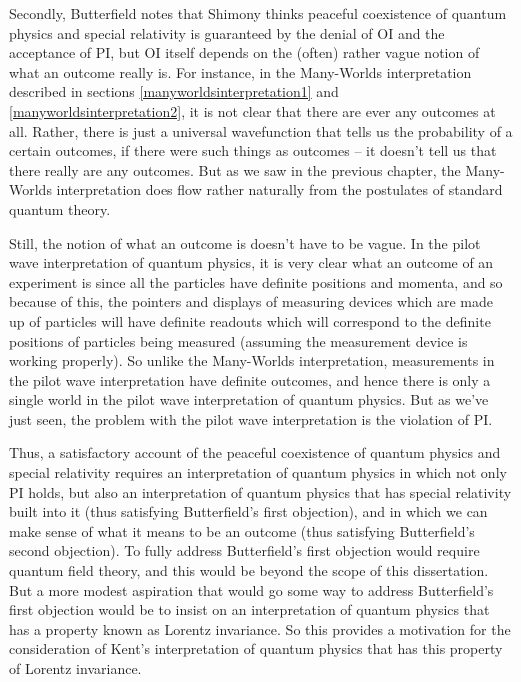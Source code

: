 Secondly,  Butterfield notes that Shimony thinks peaceful coexistence of quantum physics and special relativity is guaranteed by the denial of OI and the acceptance of PI, but OI itself depends on the (often) rather vague notion of what an outcome really is. For instance, in the Many-Worlds interpretation described in sections \ref{manyworldsinterpretation1} and \ref{manyworldsinterpretation2}, it is not clear that there are ever any outcomes at all. Rather, there is just a universal wavefunction that tells us the probability of a certain outcomes, if there were such things as outcomes -- it doesn't tell us that there really are any outcomes. But as we saw in the previous chapter, the Many-Worlds interpretation does flow rather naturally from the postulates of standard quantum theory. 

Still, the notion of what an outcome is doesn't have to be vague. In the pilot wave interpretation of quantum physics, it is very clear what an outcome of an experiment is since all the particles have definite positions and momenta, and so because of this, the pointers and displays of measuring devices which are made up of particles will have definite readouts which will correspond to the definite positions of particles being measured (assuming the measurement device is working properly). So unlike the Many-Worlds interpretation, measurements in the pilot wave interpretation have definite outcomes, and hence there is only a single world in the pilot wave interpretation of quantum physics. But as we've just seen, the problem with the pilot wave interpretation is the violation of PI.  

Thus, a satisfactory account of the peaceful coexistence of quantum physics and special relativity requires an interpretation of quantum physics in which not only PI holds, but also an interpretation of quantum physics that has special relativity built into it (thus satisfying Butterfield's first objection), and in which we can make sense of what it means to be an outcome (thus satisfying Butterfield's second objection). To fully address Butterfield's first objection would require quantum field theory, and this would be beyond the scope of this dissertation. But a more modest aspiration that would go some way to address Butterfield's first objection would be to insist on an interpretation of quantum physics that has a property known as Lorentz invariance. So this provides a motivation for the consideration of Kent's interpretation of quantum physics that has this property of Lorentz invariance.